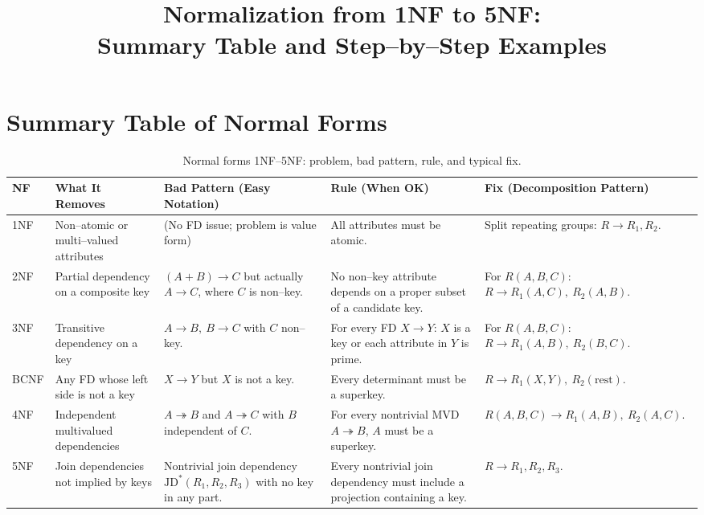 \documentclass{article}
\title{Normalization from 1NF to 5NF:\\
Summary Table and Step--by--Step Examples}
\author{}
\date{}
\begin{document}
\maketitle

\section*{Summary Table of Normal Forms}

\begin{table}[h]
  \centering
  \small
  \begin{tabularx}{\textwidth}{@{}l l X X X@{}}
    \toprule
    \textbf{NF} & \textbf{What It Removes}
                & \textbf{Bad Pattern (Easy Notation)}
                & \textbf{Rule (When OK)}
                & \textbf{Fix (Decomposition Pattern)} \\
    \midrule
    1NF &
    Non--atomic or multi--valued attributes &
    (No FD issue; problem is value form) &
    All attributes must be atomic. &
    Split repeating groups:
    $R \rightarrow R_1, R_2$. \\
    \addlinespace[0.3em]
    2NF &
    Partial dependency on a composite key &
    $(A + B) \to C$ but actually $A \to C$,
    where $C$ is non--key. &
    No non--key attribute depends on a proper subset
    of a candidate key. &
    For $R(A,B,C)$:
    $R \rightarrow R_1(A,C),\ R_2(A,B)$. \\
    \addlinespace[0.3em]
    3NF &
    Transitive dependency on a key &
    $A \to B,\ B \to C$ with $C$ non--key. &
    For every FD $X \to Y$: $X$ is a key
    or each attribute in $Y$ is prime. &
    For $R(A,B,C)$:
    $R \rightarrow R_1(A,B),\ R_2(B,C)$. \\
    \addlinespace[0.3em]
    BCNF &
    Any FD whose left side is not a key &
    $X \to Y$ but $X$ is not a key. &
    Every determinant must be a superkey. &
    $R \rightarrow R_1(X,Y),\ R_2(\text{rest})$. \\
    \addlinespace[0.3em]
    4NF &
    Independent multivalued dependencies &
    $A \twoheadrightarrow B$ and
    $A \twoheadrightarrow C$ with $B$ independent of $C$. &
    For every nontrivial MVD $A \twoheadrightarrow B$,
    $A$ must be a superkey. &
    $R(A,B,C) \rightarrow R_1(A,B),\ R_2(A,C)$. \\
    \addlinespace[0.3em]
    5NF &
    Join dependencies not implied by keys &
    Nontrivial join dependency
    $\text{JD}^\ast(R_1,R_2,R_3)$ with no key in any part. &
    Every nontrivial join dependency must include
    a projection containing a key. &
    $R \rightarrow R_1, R_2, R_3$. \\
    \bottomrule
  \end{tabularx}
  \caption{Normal forms 1NF--5NF: problem, bad pattern, rule, and typical fix.}
\end{table}
\end{document}
